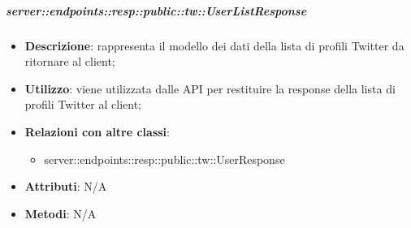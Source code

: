     \subparagraph{server::endpoints::resp::public::tw::UserListResponse} %
    \label{subp:bdsm_app_server_endpoints_resp_public_tw_userlistresponse}
    \begin{itemize}
      \item \textbf{Descrizione}: rappresenta il modello dei dati della lista di profili Twitter da ritornare al client;
      \item \textbf{Utilizzo}: viene utilizzata dalle API per restituire la response della lista di profili Twitter al client;
      \item \textbf{Relazioni con altre classi}:
        \begin{itemize}
          \item server::endpoints::resp::public::tw::UserResponse
        \end{itemize}
	  \item \textbf{Attributi}: N/A
	  \item \textbf{Metodi}: N/A
      \end{itemize}

